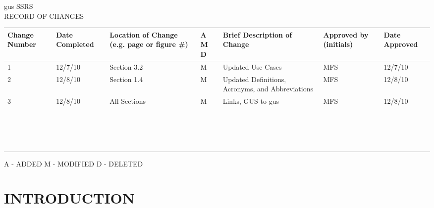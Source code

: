 \documentclass[12pt]{report}
\begin{document}
\setcounter{page}{1}
{\centering 
 gus SSRS \\[0.3cm] 
 RECORD OF CHANGES \\[0.5cm]
 \begin{tabular}{| p{1.5cm} | p{1.5cm} | p{3cm} | p{0.5cm} | p{4cm} | p{2.2cm} | p{2cm} |}
  \hline
  Change Number & Date Completed & Location of Change (e.g. page or figure \#) & A M D & Brief Description of Change & Approved by (initials) & Date Approved \\ \hline
  1 & 12/7/10 & Section 3.2 & M & Updated Use Cases & MFS & 12/7/10 \\ \hline
  2 & 12/8/10 & Section 1.4 & M & Updated Definitions, Acronyms, and Abbreviations & MFS & 12/8/10 \\ \hline  
  3 & 12/8/10 & All Sections & M & Links, GUS to gus & MFS & 12/8/10 \\ \hline 
  & & & & & &  \\ \hline  
  & & & & & &  \\ \hline  
  & & & & & &  \\ \hline  
  & & & & & &  \\ \hline
  & & & & & &  \\ \hline
  & & & & & &  \\ \hline
  & & & & & &  \\ \hline
  & & & & & &  \\ \hline
  & & & & & &  \\ \hline
  & & & & & &  \\ \hline
  & & & & & &  \\ \hline
  & & & & & &  \\ \hline
  & & & & & &  \\ \hline
  & & & & & &  \\ \hline
  & & & & & &  \\ \hline
  & & & & & &  \\ \hline
  & & & & & &  \\ \hline
 \end{tabular}
}
\newline
A - ADDED M - MODIFIED D - DELETED
\newpage


\tableofcontents
\newpage

\setcounter{page}{1}
\renewcommand*\thesection{\arabic{section}}
\section{INTRODUCTION}
\end{document}
